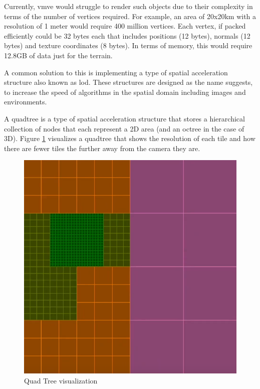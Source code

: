 \documentclass[11pt]{article}
\begin{document}
Currently, \gls*{vmve} would struggle to render such objects due to their
complexity in terms of the number of vertices required. For example, an area of
20x20km with a resolution of 1 meter would require 400 million vertices. Each
vertex, if packed efficiently could be 32 bytes each that includes positions (12
bytes), normals (12 bytes) and texture coordinates (8 bytes). In terms of
memory, this would require 12.8GB of data just for the terrain.

A common solution to this is implementing a type of spatial acceleration
structure also known as \gls*{lod}. These structures are designed as the name
suggests, to increase the speed of algorithms in the spatial domain including
images and environments.

A quadtree is a type of spatial acceleration structure that stores a
hierarchical collection of nodes that each represent a 2D area (and an octree in
the case of 3D). Figure \ref{fig:quad_tree} visualizes a quadtree that shows
the resolution of each tile and how there are fewer tiles the further away from
the camera they are.

\begin{figure}[H]
  \centering
  \includegraphics[width=\textwidth]{images/quad_tree.png}
  \caption{Quad Tree visualization}
  \label{fig:quad_tree}
\end{figure}
\end{document}

